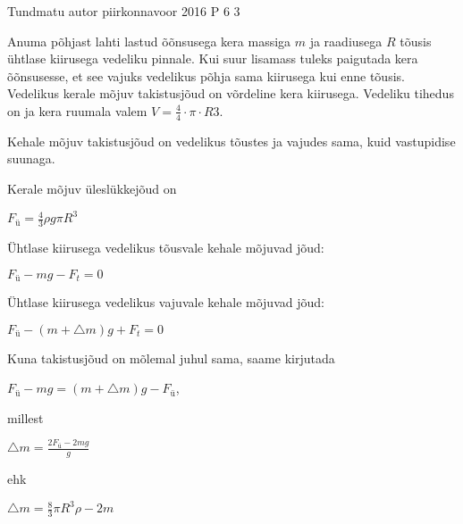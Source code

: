 {Tundmatu autor} %
{piirkonnavoor} %
{2016} %
{P 6} %
{3} %
{
\ifStatement
Anuma põhjast lahti lastud õõnsusega kera massiga $m$ ja raadiusega $R$ tõusis ühtlase kiirusega vedeliku pinnale. Kui suur lisamass tuleks paigutada kera õõnsusesse, et see vajuks vedelikus põhja sama kiirusega kui enne tõusis. Vedelikus kerale mõjuv takistusjõud on võrdeline kera kiirusega. Vedeliku tihedus on  ja kera ruumala valem $V = \frac{4}{4} \cdot \pi \cdot R3$.
\fi


\ifHint
Kehale mõjuv takistusjõud on vedelikus tõustes ja vajudes sama, kuid vastupidise suunaga.
\fi

\ifSolution
Kerale mõjuv üleslükkejõud on 
\begin{center}
${F_ü} = \frac{4}{3} \rho g \pi R^3$
\end{center}
Ühtlase kiirusega vedelikus tõusvale kehale mõjuvad jõud:
\begin{center}
${F_ü} - mg - F_t = 0$
\end{center}
Ühtlase kiirusega vedelikus vajuvale kehale mõjuvad jõud:
\begin{center}
${F_ü} - (m + \triangle m)g + F_t = 0$
\end{center}
Kuna takistusjõud on mõlemal juhul sama, saame kirjutada
\begin{center}
${F_ü} - mg = (m + \triangle m)g - F_ü$,
\end{center}
millest
\begin{center}
$\triangle m = \frac{2{F_ü} - 2mg}{g}$
\end{center}
ehk
\begin{center}
$\triangle m = \frac{8}{3}\pi R^3 \rho - 2m$
\end{center}
\fi
}